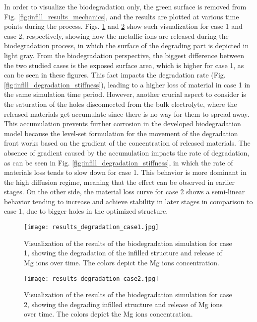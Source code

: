 In order to visualize the biodegradation only, the green surface is removed from Fig. \ref{fig:infill_results_mechanics}, and the results are plotted at various time points during the process. Figs. \ref{fig:infill_results_degradation_case1} and \ref{fig:infill_results_degradation_case2} show such visualization for case 1 and case 2, respectively, showing how the metallic ions are released during the biodegradation process, in which the surface of the degrading part is depicted in light gray. From the biodegradation perspective, the biggest difference between the two studied cases is the exposed surface area, which is higher for case 1, as can be seen in these figures. This fact impacts the degradation rate (Fig. \ref{fig:infill_degradation_stiffness}), leading to a higher loss of material in case 1 in the same simulation time period. However, another crucial aspect to consider is the saturation of the holes disconnected from the bulk electrolyte, where the released materials get accumulate since there is no way for them to spread away. This accumulation prevents further corrosion in the developed biodegradation model because the level-set formulation for the movement of the degradation front works based on the gradient of the concentration of released materials. The absence of gradient caused by the accumulation impacts the rate of degradation, as can be seen in Fig. \ref{fig:infill_degradation_stiffness}, in which the rate of materials loss tends to slow down for case 1. This behavior is more dominant in the high diffusion regime, meaning that the effect can be observed in earlier stages. On the other side, the material loss curve for case 2 shows a semi-linear behavior tending to increase and achieve stability in later stages in comparison to case 1, due to bigger holes in the optimized structure. 

\begin{figure}[h]
\centering
\medskip
\texttt{[image: results\_degradation\_case1.jpg]}
\caption[Visualization of the results of the biodegradation simulation for case 1]{Visualization of the results of the biodegradation simulation for case 1, showing the degradation of the infilled structure and release of Mg ions over time. The colors depict the Mg ions concentration.} \label{fig:infill_results_degradation_case1}
\end{figure}


\begin{figure}[h]
\centering
\medskip
\texttt{[image: results\_degradation\_case2.jpg]}
\caption[Visualization of the results of the biodegradation simulation for case 2]{Visualization of the results of the biodegradation simulation for case 2, showing the degrading infilled structure and release of Mg ions over time. The colors depict the Mg ions concentration.} \label{fig:infill_results_degradation_case2}
\end{figure}

